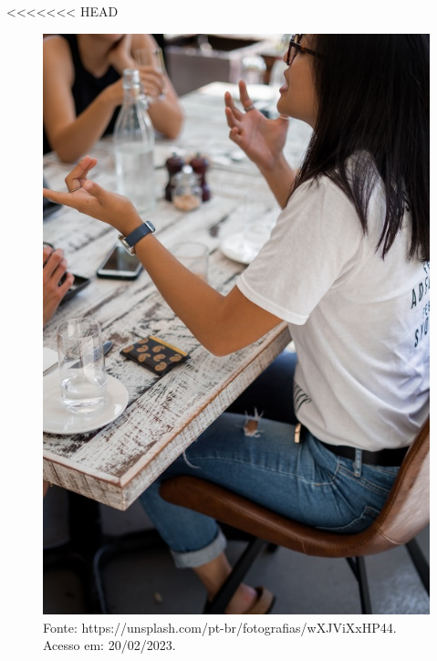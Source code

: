 <<<<<<< HEAD
\begin{figure}[htpb!]
\includegraphics[width=.5\textwidth]{./imgs/img10.jpg}
\caption{Fonte: https://unsplash.com/pt-br/fotografias/wXJViXxHP44. Acesso em: 20/02/2023.}
\end{figure}

